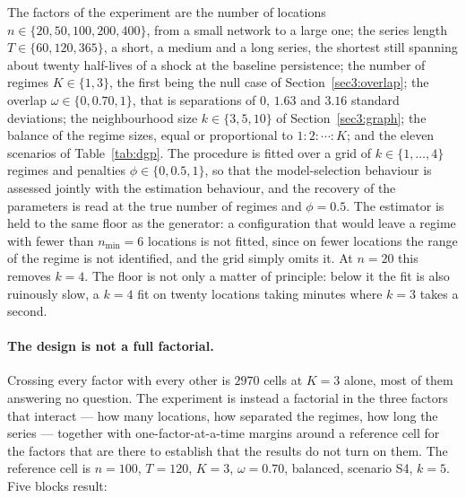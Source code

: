 The factors of the experiment are the number of locations $n \in \{20, 50, 100, 200, 400\}$, from a small network to a large one; the series length $T \in \{60, 120, 365\}$, a short, a medium and a long series, the shortest still spanning about twenty half-lives of a shock at the baseline persistence; the number of regimes $K \in \{1, 3\}$, the first being the null case of Section~\ref{sec3:overlap}; the overlap $\omega \in \{0, 0.70, 1\}$, that is separations of $0$, $1.63$ and $3.16$ standard deviations; the neighbourhood size $k \in \{3, 5, 10\}$ of Section~\ref{sec3:graph}; the balance of the regime sizes, equal or proportional to $1:2:\cdots:K$; and the eleven scenarios of Table~\ref{tab:dgp}. The procedure is fitted over a grid of $k \in \{1,\dots,4\}$ regimes and penalties $\phi \in \{0, 0.5, 1\}$, so that the model-selection behaviour is assessed jointly with the estimation behaviour, and the recovery of the parameters is read at the true number of regimes and $\phi = 0.5$. The estimator is held to the same floor as the generator: a configuration that would leave a regime with fewer than $n_{\min} = 6$ locations is not fitted, since on fewer locations the range of the regime is not identified, and the grid simply omits it. At $n = 20$ this removes $k = 4$. The floor is not only a matter of principle: below it the fit is also ruinously slow, a $k=4$ fit on twenty locations taking minutes where $k=3$ takes a second.

\paragraph{The design is not a full factorial.} Crossing every factor with every other is $2970$ cells at $K=3$ alone, most of them answering no question. The experiment is instead a factorial in the three factors that interact --- how many locations, how separated the regimes, how long the series --- together with one-factor-at-a-time margins around a reference cell for the factors that are there to establish that the results do not turn on them. The reference cell is $n = 100$, $T = 120$, $K = 3$, $\omega = 0.70$, balanced, scenario S4, $k = 5$. Five blocks result:

